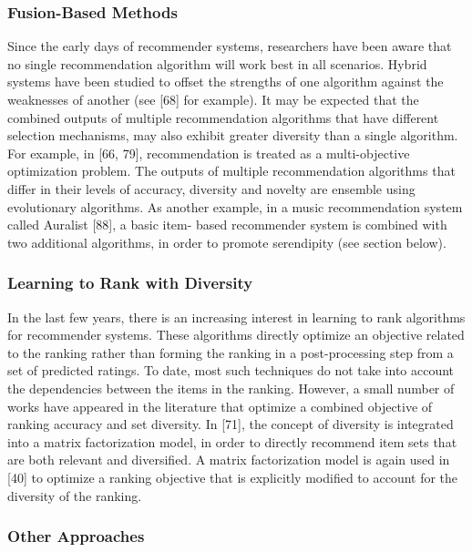 \subsubsection{Fusion-Based Methods}

Since the early days of recommender systems, researchers have been aware that no single recommendation algorithm will work best in all scenarios. Hybrid systems have been studied to offset the strengths of one algorithm against the weaknesses of another (see [68] for example). It may be expected that the combined outputs of multiple recommendation algorithms that have different selection mechanisms, may also exhibit greater diversity than a single algorithm. For example, in [66, 79], recommendation is treated as a multi-objective optimization problem. The outputs of multiple recommendation algorithms that differ in their levels of accuracy, diversity and novelty are ensemble using evolutionary algorithms. As another example, in a music recommendation system called Auralist [88], a basic item- based recommender system is combined with two additional algorithms, in order to promote serendipity (see section below).

\subsubsection{Learning to Rank with Diversity}

In the last few years, there is an increasing interest in learning to rank algorithms for recommender systems. These algorithms directly optimize an objective related to the ranking rather than forming the ranking in a post-processing step from a set of predicted ratings. To date, most such techniques do not take into account the dependencies between the items in the ranking. However, a small number of works have appeared in the literature that optimize a combined objective of ranking accuracy and set diversity. In [71], the concept of diversity is integrated into a matrix factorization model, in order to directly recommend item sets that are both relevant and diversified. A matrix factorization model is again used in [40] to optimize a ranking objective that is explicitly modified to account for the diversity of the ranking.

\subsubsection{Other Approaches}

